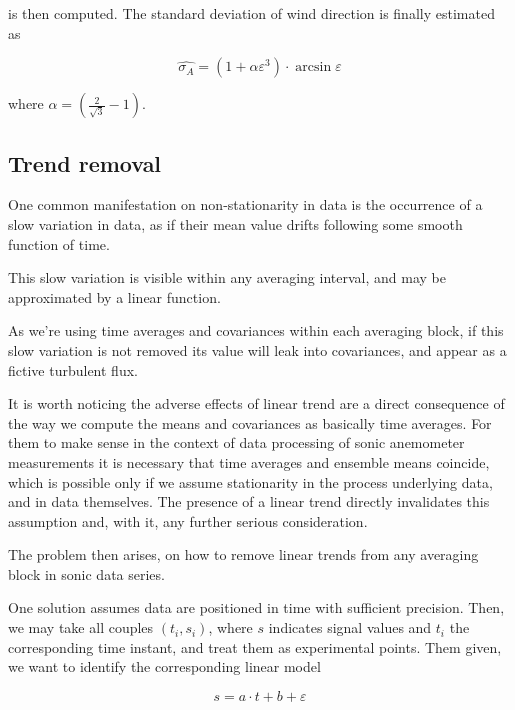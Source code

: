 \documentclass[a4paper,10pt]{book}
\begin{document}
\noindent is then computed. The standard deviation of wind direction is finally estimated as

\begin{equation}\label{eq:Yamartino estimate of standard deviation of horizontal direction}
	\hat{\sigma_{A}} = \left( 1 + \alpha \varepsilon^{3} \right)\cdot \arcsin{\varepsilon}
\end{equation}

\noindent where $\alpha = \left( \frac{2}{\sqrt{3}} - 1 \right)$.


\subsection{Trend removal}

One common manifestation on non-stationarity in data is the occurrence of a slow variation in data, as if their mean value drifts following some smooth function of time.

This slow variation is visible within any averaging interval, and may be approximated by a linear function.

As we're using time averages and covariances within each averaging block, if this slow variation is not removed its value will leak into covariances, and appear as a fictive turbulent flux.

It is worth noticing the adverse effects of linear trend are a direct consequence of the way we compute the means and covariances as basically time averages. For them to make sense in the context of data processing of sonic anemometer measurements it is necessary that time averages and ensemble means coincide, which is possible only if we assume stationarity in the process underlying data, and in data themselves. The presence of a linear trend directly invalidates this assumption and, with it, any further serious consideration.

The problem then arises, on how to remove linear trends from any averaging block in sonic data series.

One solution assumes data are positioned in time with sufficient precision. Then, we may take all couples $(t_{i},s_{i})$, where $s$ indicates signal values and $t_{i}$ the corresponding time instant, and treat them as experimental points. Them given, we want to identify the corresponding linear model

\begin{equation}\label{eq:Trend Concept}
 s = a \cdot t + b + \varepsilon
\end{equation}
\end{document}
